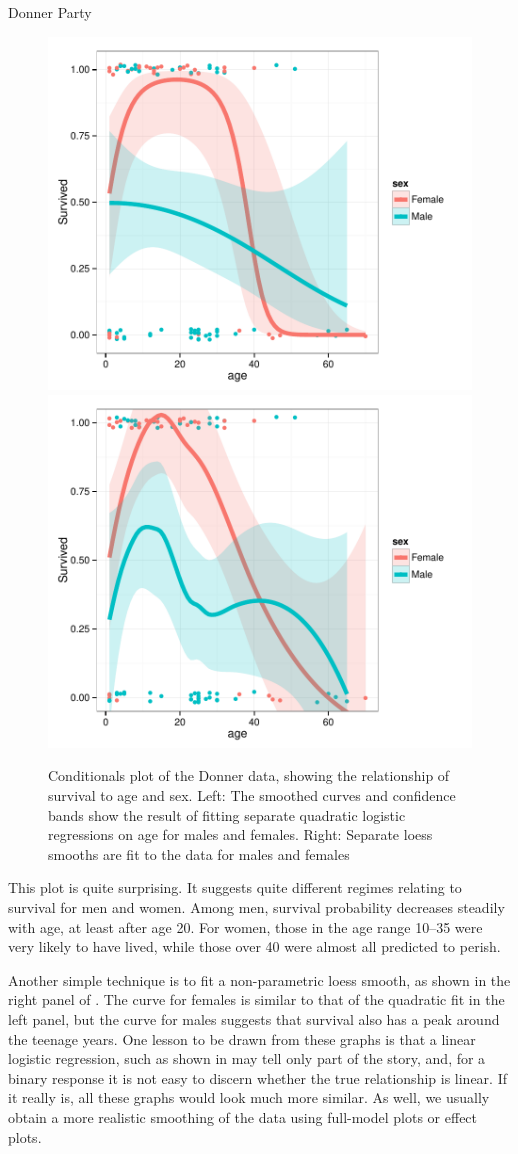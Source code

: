 \documentclass[11pt]{book}\usepackage[]{graphicx}\usepackage[]{color}
\newenvironment{knitrout}{}{} %
\renewenvironment{knitrout}{\small\renewcommand{\baselinestretch}{.85}}{} %
\begin{document}
\begin{Example}[donner1]{Donner Party}
\begin{knitrout}
\begin{figure}[!htbp]
\centerline{\includegraphics[width=.5\textwidth]{ch07/fig/donner1-cond3-1} 
\includegraphics[width=.5\textwidth]{ch07/fig/donner1-cond3-2} }

\caption[Conditionals plot of the Donner data, showing the relationship of survival to age and sex]{Conditionals plot of the Donner data, showing the relationship of survival to age and sex. Left: The smoothed curves and confidence bands show the result of fitting separate quadratic logistic regressions on age for males and females. Right: Separate loess smooths are fit to the data for males and females\label{fig:donner1-cond3}}
\end{figure}


\end{knitrout}
This plot is quite surprising.  It suggests quite different regimes relating to survival
for men and women.  Among men, survival probability decreases steadily with age, at
least after age 20.  For women, those in the age range 10--35 were very likely to have
lived, while those over 40 were almost all predicted to perish.

Another simple technique is to fit a non-parametric loess smooth, as shown in the
right panel of .  The curve for females is similar
to that of the quadratic fit in the left panel, but the curve for males
suggests that survival also has a peak around the teenage years.
One lesson to be drawn from these graphs is that a linear logistic regression,
such as shown in  may tell only part of the story,
and, for a binary response it is not easy to discern whether the true
relationship is linear.  If it really is, all these graphs would look much
more similar.  As well, we usually obtain a more realistic smoothing of
the data using full-model plots or effect plots.



\end{Example}
\end{document}
